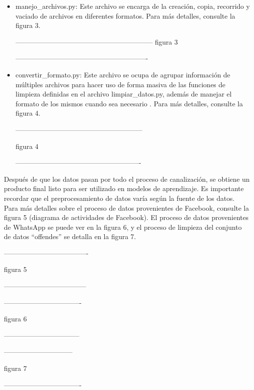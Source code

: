 \begin{itemize}

\item manejo\_archivos.py: Este archivo se encarga de la creación, copia, recorrido y vaciado de archivos en diferentes formatos. Para más detalles, consulte la figura 3.

------------------------------------------------------------
figura 3

----------------------------------------------------------

\item convertir\_formato.py: Este archivo se ocupa de agrupar información de múltiples archivos para hacer uso de forma masiva de las funciones de limpieza definidas en el archivo limpiar\_datos.py, además de manejar el formato de los mismos cuando sea necesario . Para más detalles, consulte la figura 4.

--------------------------------------------------------

figura 4

-------------------------------------------------------

\end{itemize}

Después de que los datos pasan por todo el proceso de canalización, se obtiene un producto final listo para ser utilizado en modelos de aprendizaje. Es importante recordar que el preprocesamiento de datos varía según la fuente de los datos. Para más detalles sobre el proceso de datos provenientes de Facebook, consulte la figura 5 (diagrama de actividades de Facebook). El proceso de datos provenientes de WhatsApp se puede ver en la figura 6, y el proceso de limpieza del conjunto de datos ``offendes'' se detalla en la figura 7.

-------------------------------------

figura 5

------------------------------------


----------------------------------

figura 6

---------------------------------

------------------------------

figura 7

----------------------------------
